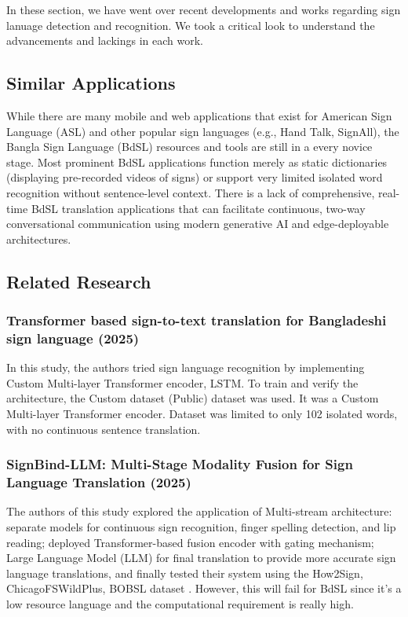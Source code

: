 In these section, we have went over recent developments and works regarding sign lanuage detection and recognition. We took a critical look to understand the advancements and lackings in each work.

\subsection{Similar Applications}

While there are many mobile and web applications that exist for American Sign Language (ASL) and other popular sign languages (e.g., Hand Talk, SignAll), the Bangla Sign Language (BdSL) resources and tools are still in a every novice stage. Most prominent BdSL applications function merely as static dictionaries (displaying pre-recorded videos of signs) or support very limited isolated word recognition without sentence-level context. There is a lack of comprehensive, real-time BdSL translation applications that can facilitate continuous, two-way conversational communication using modern generative AI and edge-deployable architectures.

\subsection{Related Research}

\subsubsection{Transformer based sign-to-text translation for Bangladeshi sign language (2025)}
In this study, the authors tried sign language recognition by implementing Custom Multi-layer Transformer encoder, LSTM. To train and verify the architecture, the Custom dataset (Public) dataset was used. It was a Custom Multi-layer Transformer encoder. Dataset was limited to only 102 isolated words, with no continuous sentence translation.\cite{rayhan_bdsl_transformer_2025}

\subsubsection{SignBind-LLM: Multi-Stage Modality Fusion for Sign Language Translation (2025)}
The authors of this study explored the application of Multi-stream architecture: separate models for continuous sign recognition, finger spelling detection, and lip reading; deployed Transformer-based fusion encoder with gating mechanism; Large Language Model (LLM) for final translation to provide more accurate sign language translations, and finally tested their system using the How2Sign, ChicagoFSWildPlus, BOBSL dataset \cite{142}. However, this will fail for BdSL since it’s a low resource language and the computational requirement is really high.\cite{wang_signbind_llm_2025}


